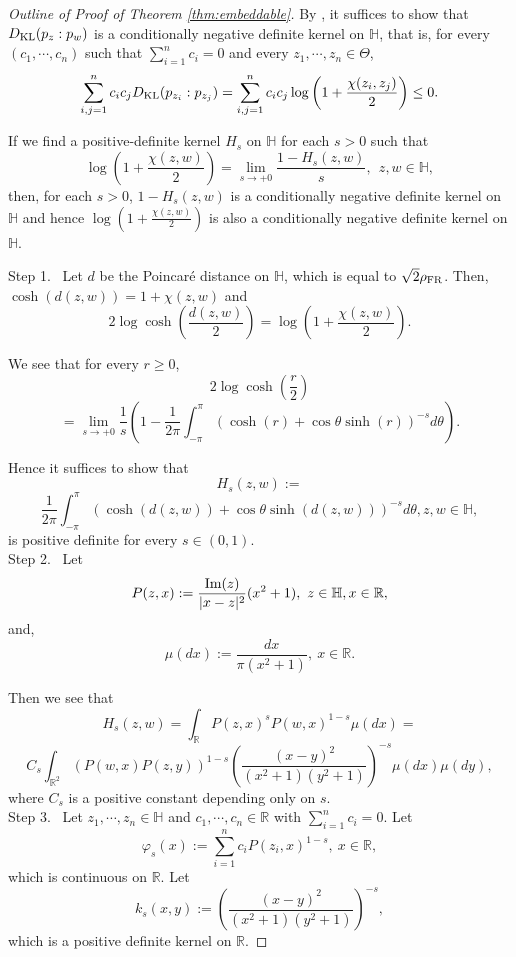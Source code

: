 \documentclass[journal]{IEEEtran}
\begin{document}
\begin{proof}[Outline of Proof of Theorem \ref{thm:embeddable}]
By \cite{Schoenberg1938}, 
it suffices to show that $D_{\textup{KL}} (p_{z}:p_{w})$ is a conditionally negative definite kernel on $\mathbb H$, that is,  
for every $(c_1, \cdots, c_n)$ such that $\sum_{i=1}^{n} c_i = 0$ and every $z_1, \cdots, z_n \in \Theta$, 
\begin{equation*}
\sum_{i,j=1}^{n} c_i c_j D_{\textup{KL}} (p_{z_i}:p_{z_j}) 
= \sum_{i,j=1}^{n} c_i c_j  \log \left( 1 + \frac{\chi(z_i,z_j)}{2} \right) \le 0.
\end{equation*}

If we find a positive-definite kernel $H_s$ on $\mathbb H$ for each $s > 0$ such that 
\[ \log \left( 1 + \frac{\chi(z,w)}{2} \right) = \lim_{s \to +0} \frac{1-H_s (z,w)}{s}, \ \ z, w \in \mathbb H, \]
then, for each $s > 0$, 
$1-H_s (z,w)$ is a conditionally negative definite kernel on $\mathbb H$ and hence $\log \left( 1 + \frac{\chi(z,w)}{2} \right)$ is also 
a conditionally negative definite kernel on $\mathbb H$. 

Step 1. \ Let $d$ be the Poincar\'e distance on $\mathbb H$, which is equal to $\sqrt{2}\rho_{\textup{FR}}$. 
Then, $\cosh(d(z,w)) = 1 + \chi(z,w)$ and  
$$2 \log \cosh \left(\frac{d(z,w)}{2} \right) = \log \left( 1 + \frac{\chi(z,w)}{2} \right).$$  

We see that for every $r \ge 0$, 
\[ 2 \log \cosh \left(\frac{r}{2} \right) \]
\[= \lim_{s \to +0} \frac{1}{s} \left( 1 - \frac{1}{2\pi} \int_{-\pi}^{\pi}  \left( \cosh(r) + \cos \theta \sinh (r) \right)^{-s} d\theta \right).\]

Hence it suffices to show that 
\[ H_s (z,w) := \]
\[\frac{1}{2\pi} \int_{-\pi}^{\pi}  \left( \cosh(d(z,w)) + \cos \theta \sinh (d(z,w)) \right)^{-s} d\theta, z,w \in \mathbb H, \]
is positive definite for every $s \in (0,1)$. \\

Step 2. \ Let 
\[ P(z,x) := \frac{\textup{Im}(z)}{|x-z|^2} (x^2 + 1), \ z \in \mathbb H, x \in \mathbb R, \]
and,  
\[ \mu(dx) := \dfrac{dx}{\pi (x^2 + 1)}, \ x \in \mathbb{R}.\]

Then we see that 
\[ H_s (z,w) = \int_{\mathbb R} P(z,x)^s P(w,x)^{1-s} \mu(dx) = \]
\[ C_s \int_{\mathbb R^2} (P(w,x)P(z,y))^{1-s} \left( \frac{(x-y)^2}{(x^2 + 1) (y^2 + 1)} \right)^{-s} \mu(dx)\mu(dy), \]
where $C_s$ is a positive constant depending only on $s$. \\

Step 3. \ Let $z_1, \cdots, z_n \in \mathbb H$ and $c_1, \cdots, c_n \in \mathbb R$ with $\sum_{i=1}^{n} c_i = 0$. 
Let 
\begin{equation}\label{def-varphi_s}
\varphi_s (x) := \sum_{i=1}^{n} c_i P(z_i, x)^{1-s}, \ x \in \mathbb R,
\end{equation} 
which is continuous on $\mathbb R$.  
Let 
\begin{equation}\label{def-k_s}
k_s (x,y) := \left( \frac{(x-y)^2}{(x^2 + 1) (y^2 + 1)} \right)^{-s}, 
\end{equation} 
which is a positive definite kernel on $\mathbb R$. 


\end{proof}
\end{document}
